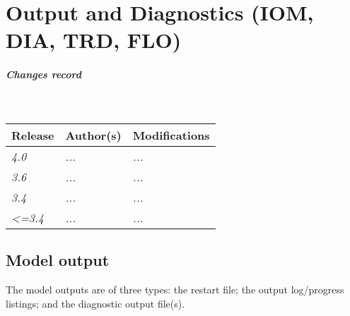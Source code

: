 \documentclass[../main/NEMO_manual]{subfiles}
\begin{document}
\chapter{Output and Diagnostics (IOM, DIA, TRD, FLO)}
\label{chap:DIA}


\chaptertoc

\paragraph{Changes record} ~\\

{\footnotesize
  \begin{tabularx}{\textwidth}{l||X|X}
    Release & Author(s) & Modifications \\
    \hline
    {\em   4.0} & {\em ...} & {\em ...} \\
    {\em   3.6} & {\em ...} & {\em ...} \\
    {\em   3.4} & {\em ...} & {\em ...} \\
    {\em <=3.4} & {\em ...} & {\em ...}
  \end{tabularx}
}

\clearpage

\section{Model output}
\label{sec:DIA_io_old}

The model outputs are of three types: the restart file; the output log/progress listings;
and the diagnostic output file(s).  
\end{document}
